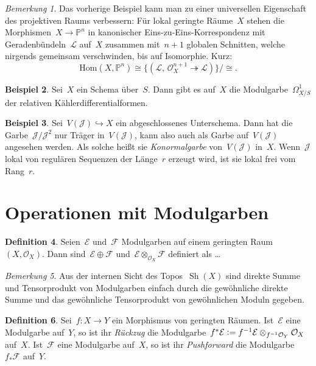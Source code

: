 \documentclass[a4paper,ngerman,12pt]{scrartcl}
\theoremstyle{definition}
\newtheorem{defn}{Definition}[section]
\newtheorem{ex}[defn]{Beispiel}
\theoremstyle{plain}
\theoremstyle{remark}
\newtheorem{rem}[defn]{Bemerkung}
\newcommand{\PP}{\mathbb{P}}
\newcommand{\E}{\mathcal{E}}
\newcommand{\F}{\mathcal{F}}
\newcommand{\J}{\mathcal{J}}
\renewcommand{\L}{\mathcal{L}}
\renewcommand{\O}{\mathcal{O}}
\newcommand{\Hom}{\mathrm{Hom}}
\newcommand{\Sh}{\operatorname{Sh}}
\newcommand{\defeq}{\vcentcolon=}
\begin{document}
\begin{rem}Das vorherige Beispiel kann man zu einer universellen Eigenschaft
des projektiven Raums verbessern: Für lokal geringte Räume~$X$ stehen die
Morphismen~$X \to \PP^n$ in kanonischer Eins-zu-Eins-Korrespondenz mit
Geradenbündeln~$\L$ auf~$X$ zusammen mit~$n + 1$ globalen Schnitten, welche
nirgends gemeinsam verschwinden, bis auf Isomorphie. Kurz:
\[ \Hom(X, \PP^n) \cong \{ (\L,\,\O_X^{n+1} \twoheadrightarrow \L) \}/{\cong}. \]
\end{rem}

\begin{ex}Sei~$X$ ein Schema über~$S$. Dann gibt es auf~$X$ die
Modulgarbe~$\Omega^1_{X/S}$ der relativen Kählerdifferentialformen.\end{ex}

\begin{ex}Sei~$V(\J) \hookrightarrow X$ ein abgeschlossenes Unterschema. Dann
hat die Garbe~$\J/\J^2$ nur Träger in~$V(\J)$, kann also auch als Garbe
auf~$V(\J)$ angesehen werden. Als solche heißt sie \emph{Konormalgarbe}
von~$V(\J)$ in~$X$. Wenn~$\J$ lokal von regulären Sequenzen der Länge~$r$
erzeugt wird, ist sie lokal frei vom Rang~$r$.\end{ex}


\section{Operationen mit Modulgarben}

\begin{defn}Seien~$\E$ und~$\F$ Modulgarben auf einem geringten Raum~$(X,\O_X)$. Dann
sind~$\E \oplus \F$ und~$\E \otimes_{\O_X} \F$ definiert als \ldots\end{defn}

\begin{rem}Aus der internen Sicht des Topos~$\Sh(X)$ sind direkte Summe und
Tensorprodukt von Modulgarben einfach durch die gewöhnliche direkte Summe und
das gewöhnliche Tensorprodukt von gewöhnlichen Moduln gegeben.\end{rem}

\begin{defn}Sei~$f : X \to Y$ ein Morphismus von geringten Räumen. Ist~$\E$
eine Modulgarbe auf~$Y$, so ist ihr \emph{Rückzug} die Modulgarbe~$f^*\E \defeq
f^{-1}\E \otimes_{f^{-1}\O_Y} \O_X$ auf~$X$. Ist~$\F$ eine Modulgarbe auf~$X$,
so ist ihr \emph{Pushforward} die Modulgarbe~$f_*\F$ auf~$Y$.\end{defn}
\end{document}
